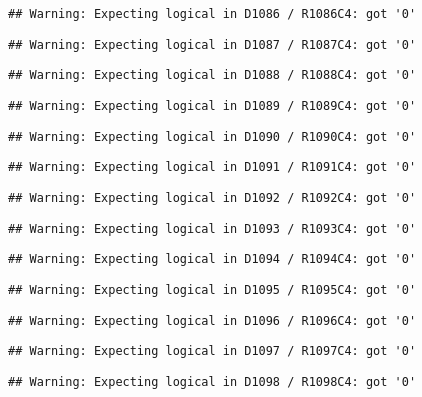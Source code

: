 \documentclass[
]{article}
\begin{document}
\begin{verbatim}
## Warning: Expecting logical in D1086 / R1086C4: got '0'
\end{verbatim}

\begin{verbatim}
## Warning: Expecting logical in D1087 / R1087C4: got '0'
\end{verbatim}

\begin{verbatim}
## Warning: Expecting logical in D1088 / R1088C4: got '0'
\end{verbatim}

\begin{verbatim}
## Warning: Expecting logical in D1089 / R1089C4: got '0'
\end{verbatim}

\begin{verbatim}
## Warning: Expecting logical in D1090 / R1090C4: got '0'
\end{verbatim}

\begin{verbatim}
## Warning: Expecting logical in D1091 / R1091C4: got '0'
\end{verbatim}

\begin{verbatim}
## Warning: Expecting logical in D1092 / R1092C4: got '0'
\end{verbatim}

\begin{verbatim}
## Warning: Expecting logical in D1093 / R1093C4: got '0'
\end{verbatim}

\begin{verbatim}
## Warning: Expecting logical in D1094 / R1094C4: got '0'
\end{verbatim}

\begin{verbatim}
## Warning: Expecting logical in D1095 / R1095C4: got '0'
\end{verbatim}

\begin{verbatim}
## Warning: Expecting logical in D1096 / R1096C4: got '0'
\end{verbatim}

\begin{verbatim}
## Warning: Expecting logical in D1097 / R1097C4: got '0'
\end{verbatim}

\begin{verbatim}
## Warning: Expecting logical in D1098 / R1098C4: got '0'
\end{verbatim}
\end{document}
